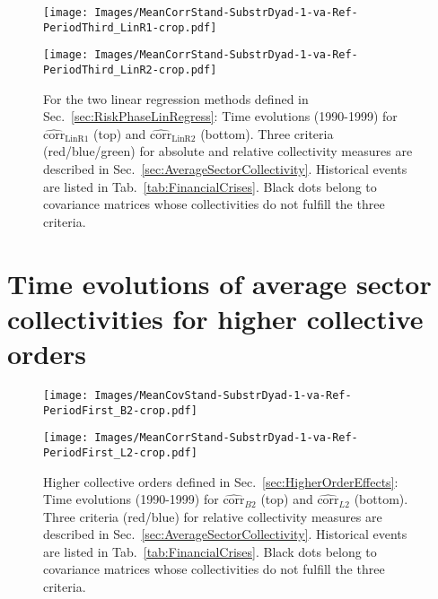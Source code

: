 \documentclass[aps, pra, groupedaddress, showkeys, twocolumn, floatfix, 10pt]{revtex4-2}
\newcommand*\meanNONDiag[1]{\widehat{#1}}
\begin{document}
%
\begin{figure*}[!htb]
	\centering
	\begin{minipage}{1.0\textwidth}
		\subfloat%
		{\texttt{[image: Images/MeanCorrStand-SubstrDyad-1-va-Ref-PeriodThird\_LinR1-crop.pdf]}
		}\par
		\subfloat%
		{\texttt{[image: Images/MeanCorrStand-SubstrDyad-1-va-Ref-PeriodThird\_LinR2-crop.pdf]}
		}%
	\end{minipage}%
	\caption{\label{subfig:Main:MeanValCovP3_LinR}For the two linear regression methods defined in Sec.~\ref{sec:RiskPhaseLinRegress}: Time evolutions (1990-1999) for $\meanNONDiag{\text{corr}}_{\text{LinR1}}$ (top) and $\meanNONDiag{\text{corr}}_{\text{LinR2}}$ (bottom).
		Three criteria (red/blue/green) for absolute and relative collectivity measures are described in Sec.~\ref{sec:AverageSectorCollectivity}. Historical events are listed in Tab.~\ref{tab:FinancialCrises}. Black dots belong to covariance matrices whose collectivities do not fulfill the three criteria.}
\end{figure*}
%



\clearpage


\section{\label{sec:TimeEvoHighCollec}Time evolutions of average sector collectivities for higher collective orders}

%
\begin{figure*}[!htb]
	\centering
	\begin{minipage}{1.0\textwidth}
		\subfloat%
		{\texttt{[image: Images/MeanCovStand-SubstrDyad-1-va-Ref-PeriodFirst\_B2-crop.pdf]}
		}\par
		\subfloat%
		{\texttt{[image: Images/MeanCorrStand-SubstrDyad-1-va-Ref-PeriodFirst\_L2-crop.pdf]}
		}%
	\end{minipage}%
	\caption{\label{subfig:Main:MeanValCovP1_BL2}Higher collective orders defined in Sec.~\ref{sec:HigherOrderEffects}: Time evolutions (1990-1999) for $\meanNONDiag{\text{corr}}_{B2}$ (top) and $\meanNONDiag{\text{corr}}_{L2}$ (bottom).
		Three criteria (red/blue) for relative collectivity measures are described in Sec.~\ref{sec:AverageSectorCollectivity}. Historical events are listed in Tab.~\ref{tab:FinancialCrises}. Black dots belong to covariance matrices whose collectivities do not fulfill the three criteria.}
\end{figure*}
%
\end{document}
